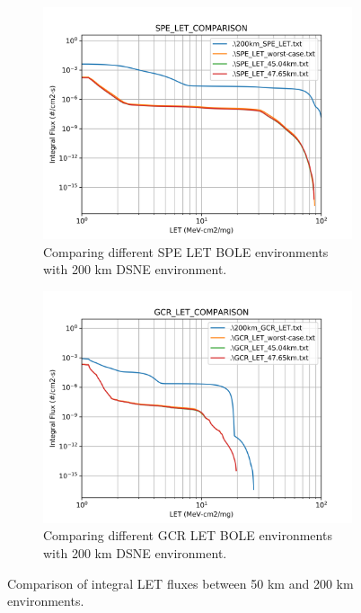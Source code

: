 \documentclass{hitec}
\begin{document}
\begin{figure}[htbp!]
	\centering
	\begin{subfigure}[b]{0.65\textwidth}
		\centering
		\includegraphics[width=\textwidth]{SPE_LET_COMPARISON.png}
		\caption{Comparing different SPE LET BOLE environments with 200 km DSNE environment.}
		\label{sfig:SPE_LET_COMPARISON}
	\end{subfigure}
	\hfill
	\begin{subfigure}[b]{0.65\textwidth}
		\centering
		\includegraphics[width=\textwidth]{GCR_LET_COMPARISON.png}
		\caption{Comparing different GCR LET BOLE environments with 200 km DSNE environment.}
		\label{sfig:GCR_LET_COMPARISON}
	\end{subfigure}
	\caption{Comparison of integral LET fluxes between 50 km and 200 km environments.}
	\label{fig:LET_COMPARISON}
\end{figure}
\end{document}
